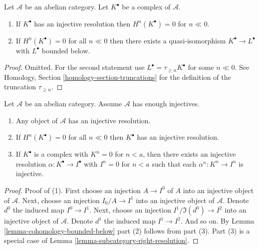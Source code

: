 \begin{lemma}
\label{lemma-cohomology-bounded-below}
Let $\mathcal{A}$ be an abelian category.
Let $K^\bullet$ be a complex of $\mathcal{A}$.
\begin{enumerate}
\item If $K^\bullet$ has an injective resolution then
$H^n(K^\bullet) = 0$ for $n \ll 0$.
\item If $H^n(K^\bullet) = 0$ for all $n \ll 0$ then there
exists a quasi-isomorphism $K^\bullet \to L^\bullet$
with $L^\bullet$ bounded below.
\end{enumerate}
\end{lemma}

\begin{proof}
Omitted. For the second statement use
$L^\bullet = \tau_{\geq n}K^\bullet$ for
some $n \ll 0$. See
Homology, Section \ref{homology-section-truncations}
for the definition of the truncation $\tau_{\geq n}$.
\end{proof}

\begin{lemma}
\label{lemma-injective-resolutions-exist}
Let $\mathcal{A}$ be an abelian category.
Assume $\mathcal{A}$ has enough injectives.
\begin{enumerate}
\item Any object of $\mathcal{A}$ has an injective resolution.
\item If $H^n(K^\bullet) = 0$ for all $n \ll 0$ then
$K^\bullet$ has an injective resolution.
\item If $K^\bullet$ is a complex with $K^n = 0$ for $n < a$, then
there exists an injective resolution $\alpha : K^\bullet \to I^\bullet$
with $I^n = 0$ for $n < a$ such that each $\alpha^n : K^n \to I^n$ is
injective.
\end{enumerate}
\end{lemma}

\begin{proof}
Proof of (1). First choose an injection $A \to I^0$ of $A$ into an
injective object of $\mathcal{A}$. Next, choose an injection
$I_0/A \to I^1$ into an injective object of $\mathcal{A}$.
Denote $d^0$ the induced map $I^0 \to I^1$.
Next, choose an injection $I^1/\Im(d^0) \to I^2$ into
an injective object of $\mathcal{A}$. Denote $d^1$ the induced
map $I^1 \to I^2$. And so on.
By Lemma \ref{lemma-cohomology-bounded-below} part (2) follows from part (3).
Part (3) is a special case of
Lemma \ref{lemma-subcategory-right-resolution}.
\end{proof}

